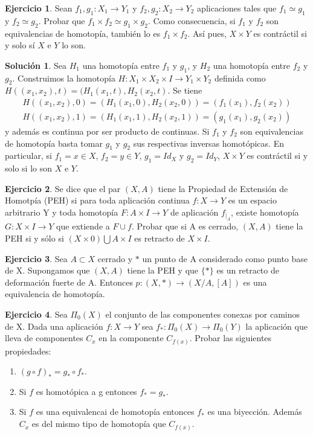 \documentclass{article}
\theoremstyle{plain}
\theoremstyle{definition}
\newtheorem{exercise}{Ejercicio}
\newtheorem*{sol*}{Solución}
\begin{document}
\newpage
\begin{exercise}
Sean $f_1,g_1:X_1\to Y_1$ y $f_2,g_2:X_2\to Y_2$ aplicaciones tales que $f_1\simeq g_1$ y $f_2\simeq g_2$. Probar que $f_1\times f_2\simeq g_1\times g_2$. Como consecuencia, si $f_1$ y $f_2$ son equivalencias de homotopía, también lo es $f_1\times f_2$. Así pues, $X\times Y$ es contráctil si y solo sí $X$ e $Y$ lo son.
\end{exercise}
\begin{sol*}
Sea $H_1$ una homotopía entre $f_1$ y $g_1$, y $H_2$ una homotopía entre $f_2$ y $g_2$. Construimos la homotopía $H:X_1\times X_2\times I\to Y_1\times Y_2$ definida como $H((x_1,x_2),t)=(H_1(x_1,t),H_2(x_2,t)$. Se tiene
\begin{gather*}
H((x_1,x_2),0)=(H_1(x_1,0),H_2(x_2,0))=(f_1(x_1),f_2(x_2))\\
H((x_1,x_2),1)=(H_1(x_1,1),H_2(x_2,1))=(g_1(x_1),g_2(x_2))
\end{gather*}
y además es continua por ser producto de continuas. Si $f_1$ y $f_2$ son equivalencias de homotopía basta tomar $g_1$ y $g_2$ sus respectivas inversas homotópicas. En particular, si $f_1=x\in X$, $f_2=y\in Y$, $g_1=Id_X$ y $g_2=Id_Y$, $X\times Y$ es contráctil si y solo si lo son $X$ e $Y$. 
\end{sol*}
\newpage
\begin{exercise}
Se dice que el par $(X,A)$ tiene la Propiedad de Extensión de Homotpía (PEH) si para toda aplicación continua $f:X\to Y$ es un espacio arbitrario Y y toda homotopía $F:A\times I \to Y$ de aplicación $f_{|_A}$, existe homotopía $G:X\times I \to Y$ que extiende a $F\cup f$. Probar que si A es cerrado, $(X,A)$ tiene la PEH si y sólo si $(X\times 0)\bigcup A\times I$ es retracto de $X\times I$.
\end{exercise}
\newpage
\begin{exercise}
Sea $A\subset X$ cerrado y $*$ un punto de A considerado como punto base de X. Supongamos que $(X,A)$ tiene la PEH y que $\{*\}$ es un retracto de deformación fuerte de A. Entonces $p:(X,*)\to(X/A,[A])$ es una equivalencia de homotopía.
\end{exercise}
\newpage
\begin{exercise}
Sea $\Pi_0(X)$ el conjunto de las componentes conexas por caminos de X. Dada una aplicación $f:X\to Y$ sea $f_*:\Pi_0(X)\to\Pi_0(Y)$ la aplicación que lleva de componentes $C_x$ en la componente $C_{f(x)}$. Probar las siguientes propiedades:
\begin{enumerate}
\item $(g\circ f)_* = g_*\circ f_*$.
\item Si $f$ es homotópica a g entonces $f_*=g_*$.
\item Si $f$ es una equivalencai de homotopía entonces $f_*$ es una biyección. Además $C_x$ es del mismo tipo de homotopía que $C_{f(x)}$.
\end{enumerate}
\end{exercise}
\end{document}
